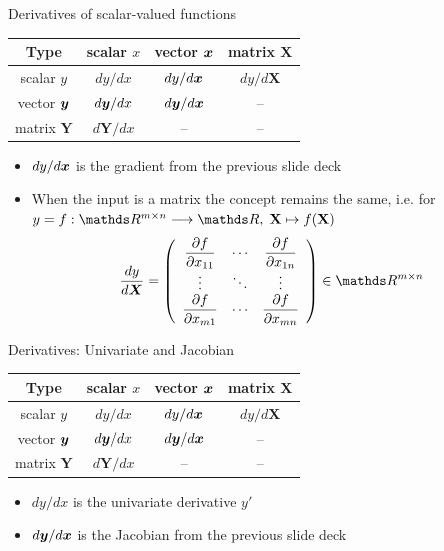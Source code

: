 \documentclass[11pt,compress,t,notes=noshow, xcolor=table]{beamer}
\begin{document}
\begin{framev}{Derivatives of scalar-valued functions}
\begin{table}
\centering
\begin{tabular}{c||c|c|c}
Type & scalar $x$ & vector $\bm{x}$ & matrix $\mathbf{X}$ \\ \hline\hline
scalar $y$ & $d y / d x$ & \cellcolor{blue!20}$d y / d\bm{x}$ & \cellcolor{blue!20}$d y / d\mathbf{X}$ \\ \hline
vector $\bm{y}$ & $d\bm{y} / d x$ & $d\bm{y} / d\bm{x}$ & -- \\ \hline
matrix $\mathbf{Y}$ & $d\mathbf{Y} / d x$ & -- & --
\end{tabular}
\end{table}
\begin{itemize}
\item $d y / d\bm{x}$ is the gradient from the previous slide deck
\spacer
\item When the input is a matrix the concept remains the same, i.e. for $y= f:\R^{m\times n}\longrightarrow\R,\; \mathbf{X}\mapsto f(\mathbf{X})$
$$
\frac{d y}{d\bm{X}}= \left(\begin{array}{ccc}
\dfrac{\partial f}{\partial x_{11}} & \cdots & \dfrac{\partial f}{\partial x_{1 n}} \\
\vdots & \ddots & \vdots \\
\dfrac{\partial f}{\partial x_{m 1}} & \cdots & \dfrac{\partial f }{\partial x_{m n}}
\end{array}\right) \in \R^{m \times n}
$$
\end{itemize}
\end{framev}


\begin{framev}{Derivatives: Univariate and Jacobian}
\begin{table}
\centering
\begin{tabular}{c||c|c|c}
Type & scalar $x$ & vector $\bm{x}$ & matrix $\mathbf{X}$ \\ \hline\hline
scalar $y$ &\cellcolor{blue!20} $d y / d x$ & $d y / d\bm{x}$ & $d y / d\mathbf{X}$ \\ \hline
vector $\bm{y}$ & $d\bm{y} / d x$ & \cellcolor{blue!20}$d\bm{y} / d\bm{x}$ & -- \\ \hline
matrix $\mathbf{Y}$ & $d\mathbf{Y} / d x$ & -- & --
\end{tabular}
\end{table}
\begin{itemize}
\item $d y / d x$ is the univariate derivative $y'$
\spacer
\item $d\bm{y} / d\bm{x}$ is the Jacobian from the previous slide deck
\end{itemize}
\end{framev}
\end{document}
